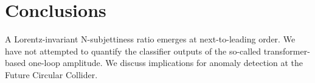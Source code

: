 \section{Conclusions}\label{sec:conclusions}

A Lorentz-invariant N-subjettiness ratio emerges at next-to-leading
order. We have not attempted to quantify the classifier outputs of the
so-called transformer-based one-loop amplitude. We discuss implications
for anomaly detection at the Future Circular Collider.

